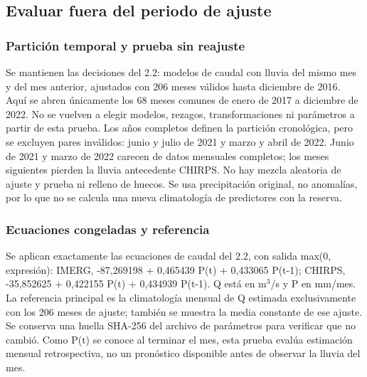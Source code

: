 \subsection{Evaluar fuera del periodo de ajuste}
\subsubsection*{Partición temporal y prueba sin reajuste}
Se mantienen las decisiones del 2.2: modelos de caudal con lluvia del mismo mes y del mes anterior, ajustados con 206 meses válidos hasta diciembre de 2016. Aquí se abren únicamente los 68 meses comunes de enero de 2017 a diciembre de 2022. No se vuelven a elegir modelos, rezagos, transformaciones ni parámetros a partir de esta prueba. Los años completos definen la partición cronológica, pero se excluyen pares inválidos: junio y julio de 2021 y marzo y abril de 2022. Junio de 2021 y marzo de 2022 carecen de datos mensuales completos; los meses siguientes pierden la lluvia antecedente CHIRPS. No hay mezcla aleatoria de ajuste y prueba ni relleno de huecos. Se usa precipitación original, no anomalías, por lo que no se calcula una nueva climatología de predictores con la reserva.
\subsubsection*{Ecuaciones congeladas y referencia}
Se aplican exactamente las ecuaciones de caudal del 2.2, con salida max(0, expresión): IMERG, -87,269198 + 0,465439 P(t) + 0,433065 P(t-1); CHIRPS, -35,852625 + 0,422155 P(t) + 0,434939 P(t-1). Q está en m$^3$/s y P en mm/mes. La referencia principal es la climatología mensual de Q estimada exclusivamente con los 206 meses de ajuste; también se muestra la media constante de ese ajuste. Se conserva una huella SHA-256 del archivo de parámetros para verificar que no cambió. Como P(t) se conoce al terminar el mes, esta prueba evalúa estimación mensual retrospectiva, no un pronóstico disponible antes de observar la lluvia del mes.
